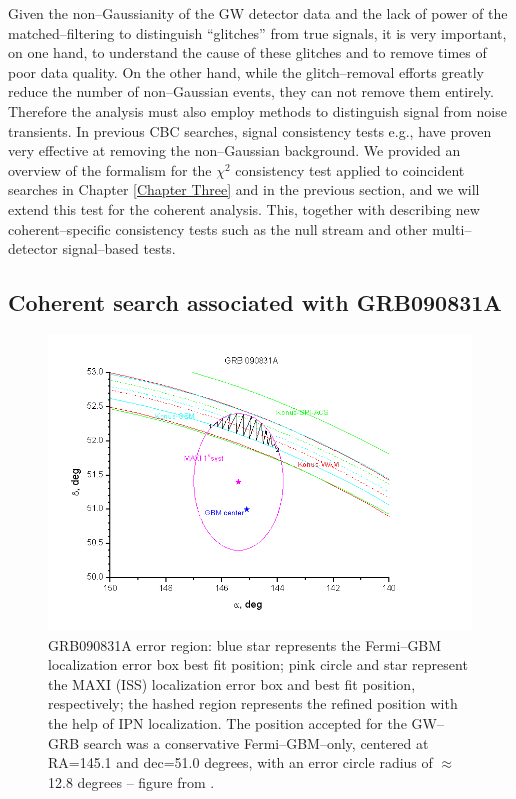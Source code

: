 Given the non--Gaussianity of the GW detector data and the lack of power of the matched--filtering to distinguish ``glitches'' from true signals, it is very important, on one hand, to understand the cause of these glitches \cite{Blackburn:2008ah} and to remove times of poor data quality. On the other hand, while the glitch--removal efforts greatly reduce the number of non--Gaussian events, they can not remove them entirely. Therefore the analysis must also employ methods to distinguish signal from noise transients. In previous \ac{CBC} searches, signal consistency tests e.g., \cite{Allen:2004gu, Hanna:2008} have proven very effective at removing the non--Gaussian background. We provided an overview of the formalism for the $\chi^{2}$ consistency test applied to coincident searches in Chapter \ref{Chapter Three} and in the previous section, and we will extend this test for the coherent analysis. This, together with describing new coherent--specific consistency tests such as the null stream and other multi--detector signal--based tests.

\subsection{Coherent search associated with GRB090831A}
\label{coh_search_grb}

\begin{figure}[ht!]
\centering
\includegraphics[scale=0.55]{Images/GRB090831A_IPN.png}
\caption{GRB090831A error region: blue star represents the Fermi--GBM localization error box best fit position; pink circle and star represent the MAXI (ISS) localization error box and best fit position, respectively; the hashed region represents the refined position with the help of IPN localization. The position accepted for the GW--GRB search was a conservative Fermi--GBM--only, centered at RA=145.1 and dec=51.0 degrees, with an error circle radius of $\approx$12.8 degrees -- figure from \cite{gcn9864}.}
\label{GRB090831A_IPN}
\end{figure}


